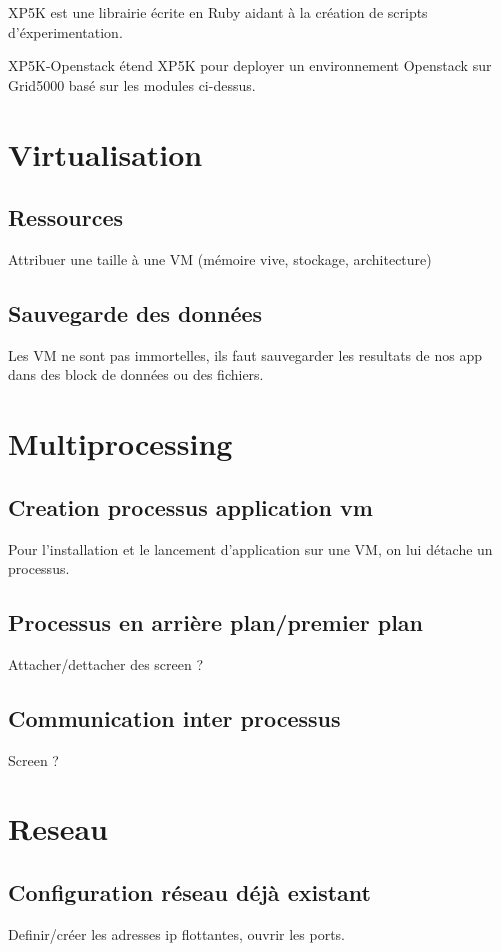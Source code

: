 \documentclass{report}
\begin{document}
        XP5K est une librairie écrite en Ruby aidant à la création de scripts d'éxperimentation.
            
        XP5K-Openstack étend XP5K pour deployer un environnement Openstack sur Grid5000 basé sur les modules ci-dessus.
            
    \section{Virtualisation}
        \subsection{Ressources}
            Attribuer une taille à une VM (mémoire vive, stockage, architecture)
        \subsection{Sauvegarde des données}
            Les VM ne sont pas immortelles, ils faut sauvegarder les resultats de nos app dans des block de données ou des fichiers.
            
    \section{Multiprocessing}
        \subsection{Creation processus application vm}
            Pour l'installation et le lancement d'application sur une VM, on lui détache un processus.
        \subsection{Processus en arrière plan/premier plan}
            Attacher/dettacher des screen ?
        \subsection{Communication inter processus}
            Screen ?
            
    \section{Reseau}
        \subsection{Configuration réseau déjà existant}
            Definir/créer les adresses ip flottantes, ouvrir les ports.
\end{document}
